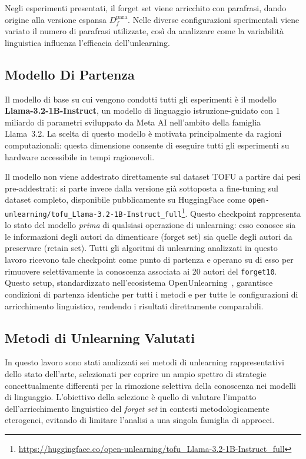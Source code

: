 Negli esperimenti presentati, il forget set viene arricchito con parafrasi, dando origine alla versione espansa $D_f^{\text{para}}$. Nelle diverse configurazioni sperimentali viene variato il numero di parafrasi utilizzate, così da analizzare come la variabilità linguistica influenza l'efficacia dell'unlearning.

\subsection{Modello Di Partenza}

Il modello di base su cui vengono condotti tutti gli esperimenti è il modello \textbf{Llama-3.2-1B-Instruct}, un modello di linguaggio istruzione-guidato con 1 miliardo di parametri sviluppato da Meta AI nell'ambito della famiglia Llama~3.2. La scelta di questo modello è motivata principalmente da ragioni computazionali: questa dimensione consente di eseguire tutti gli esperimenti su hardware accessibile in tempi ragionevoli.

Il modello non viene addestrato direttamente sul dataset TOFU a partire dai pesi pre-addestrati: si parte invece dalla versione già sottoposta a fine-tuning sul dataset completo, disponibile pubblicamente su HuggingFace come \texttt{open-unlearning/tofu\_Llama-3.2-1B-Instruct\_full}\footnote{\url{https://huggingface.co/open-unlearning/tofu_Llama-3.2-1B-Instruct_full}}. Questo checkpoint rappresenta lo stato del modello \emph{prima} di qualsiasi operazione di unlearning: esso conosce sia le informazioni degli autori da dimenticare (forget set) sia quelle degli autori da preservare (retain set). Tutti gli algoritmi di unlearning analizzati in questo lavoro ricevono tale checkpoint come punto di partenza e operano su di esso per rimuovere selettivamente la conoscenza associata ai 20 autori del \texttt{forget10}. Questo setup, standardizzato nell'ecosistema OpenUnlearning~\cite{openunlearning2025}, garantisce condizioni di partenza identiche per tutti i metodi e per tutte le configurazioni di arricchimento linguistico, rendendo i risultati direttamente comparabili.

\subsection{Metodi di Unlearning Valutati}

In questo lavoro sono stati analizzati sei metodi di unlearning rappresentativi dello stato dell’arte, selezionati per coprire un ampio spettro di strategie concettualmente differenti per la rimozione selettiva della conoscenza nei modelli di linguaggio. L’obiettivo della selezione è quello di valutare l’impatto dell’arricchimento linguistico del \emph{forget set} in contesti metodologicamente eterogenei, evitando di limitare l’analisi a una singola famiglia di approcci.

